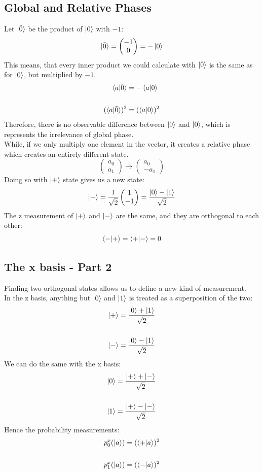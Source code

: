 \documentclass[hidelinks, a4paper, 12pt]{article}
\newcommand{\n}{\\[\baselineskip]}
\begin{document}
        \subsection{Global and Relative Phases}
            Let $\ket{\tilde{0}}$ be the product of $\ket{0}$ with $-1$:
            \[\ket{\tilde{0}} = \begin{pmatrix}
                -1 \\ 0
            \end{pmatrix} = -\ket{0}\]
            This means, that every inner product we could calculate with $\ket{\tilde{0}}$ is the same as for $\ket{0}$, but multiplied by $-1$.
            \[\begin{split}
                \braket{a|\tilde{0}} &= -\braket{a|0}\n
                (\braket{a|\tilde{0}})^2 &= (\braket{a|0})^2
            \end{split}\]
            Therefore, there is no observable difference between $\ket{0}$ and $\ket{\tilde{0}}$, which is represents the irrelevance of global phase.\n
            While, if we only multiply one element in the vector, it creates a relative phase which creates an entirely different state.
            \[\begin{pmatrix} a_0 \\ a_1 \end{pmatrix} \rightarrow \begin{pmatrix} a_0 \\ -a_1 \end{pmatrix}\]
            Doing so with $\ket{+}$ state gives us a new state:
            \[\ket{-} = \frac{1}{\sqrt{2}} \begin{pmatrix} 1 \\ -1 \end{pmatrix} = \frac{\ket{0} - \ket{1}}{\sqrt{2}}\]
            The z measurement of $\ket{+}$ and $\ket{-}$ are the same, and they are orthogonal to each other:
            \[\braket{-|+} = \braket{+|-} = 0\]

        \subsection{The x basis - Part 2}
            Finding two orthogonal states allows us to define a new kind of measurement.\n
            In the z basis, anything but $\ket{0}$ and $\ket{1}$ is treated as a superposition of the two:
            \[\begin{split}
                \ket{+} &= \frac{\ket{0} + \ket{1}}{\sqrt{2}}\n
                \ket{-} &= \frac{\ket{0} - \ket{1}}{\sqrt{2}}
            \end{split}\]
            We can do the same with the x basis:
            \[\begin{split}
                \ket{0} &= \frac{\ket{+} + \ket{-}}{\sqrt{2}}\n
                \ket{1} &= \frac{\ket{+} - \ket{-}}{\sqrt{2}}
            \end{split}\]
            Hence the probability measurements:
            \[\begin{split}
                p_0^x (\ket{a}) &= (\braket{+|a})^2\n
                p_1^x (\ket{a}) &= (\braket{-|a})^2\n
            \end{split}\]
\end{document}
